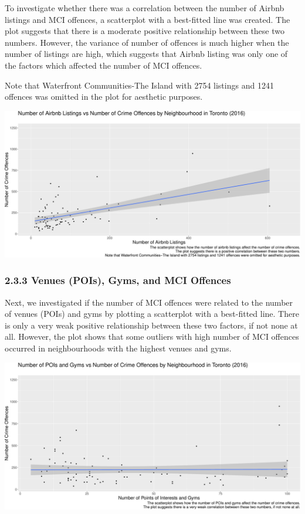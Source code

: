 \documentclass[
]{article}
\begin{document}
To investigate whether there was a correlation between the number of
Airbnb listings and MCI offences, a scatterplot with a best-fitted line
was created. The plot suggests that there is a moderate positive
relationship between these two numbers. However, the variance of number
of offences is much higher when the number of listings are high, which
suggests that Airbnb listing was only one of the factors which affected
the number of MCI offences.

Note that Waterfront Communities-The Island with 2754 listings and 1241
offences was omitted in the plot for aesthetic purposes.

\includegraphics{Final-Report_files/figure-latex/airbnb_count-1.pdf}

\hypertarget{venues-pois-gyms-and-mci-offences}{%
\subsubsection{2.3.3 Venues (POIs), Gyms, and MCI
Offences}\label{venues-pois-gyms-and-mci-offences}}

Next, we investigated if the number of MCI offences were related to the
number of venues (POIs) and gyms by plotting a scatterplot with a
best-fitted line. There is only a very weak positive relationship
between these two factors, if not none at all. However, the plot shows
that some outliers with high number of MCI offences occurred in
neighbourhoods with the highest venues and gyms.

\includegraphics{Final-Report_files/figure-latex/venues_count-1.pdf}
\end{document}
